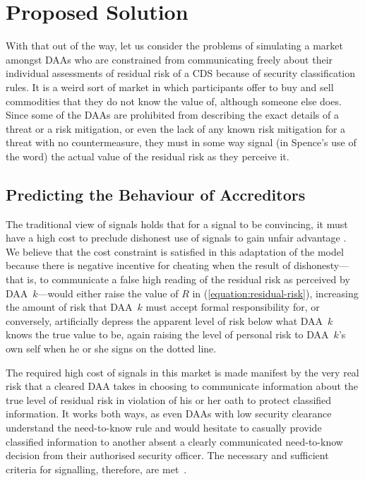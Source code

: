 \documentclass{llncs}
\begin{document}
\section{Proposed Solution}

With that out of the way, let us consider the problems of simulating a
market amongst DAAs who are constrained from communicating freely about
their individual assessments of residual risk of a CDS because of
security classification rules.  It is a weird sort of market in which
participants offer to buy and
sell commodities that they do not know the value of, although someone else
does.  Since some of the DAAs are prohibited from describing the exact details
of a threat or a risk mitigation, or even the lack of
any known risk mitigation for a threat with no countermeasure, they must
in some way signal (in Spence's use of the word) the actual value of the
residual risk as they perceive it.

\subsection{Predicting the Behaviour of Accreditors}

The traditional view of signals holds that for a signal to be convincing,
it must have a high cost to preclude dishonest use of signals to gain
unfair advantage \cite{Spence1973}.  We believe that the cost
constraint is satisfied in this adaptation of the model because there
is negative incentive for cheating when the result of dishonesty---that is,
to communicate
a false high reading of the residual risk as perceived by DAA~$k$---would
either raise the value of $R$ in (\ref{equation:residual-risk}), increasing
the amount of risk that
DAA~$k$ must accept formal responsibility for, or conversely, artificially
depress the apparent level of risk below what DAA~$k$ knows the true
value to be, again raising the level of personal risk to DAA~$k$'s own self
when he or she signs on the dotted line.

The required high cost of signals in this market is made
manifest by the very real risk that a cleared DAA takes in choosing to
communicate information about the true level of residual risk in violation
of his or her oath to protect classified information.  It works both
ways, as even DAAs with low security clearance understand the need-to-know
rule and would hesitate to casually provide classified information to another
absent a clearly communicated need-to-know decision from their authorised
security officer.  The necessary and sufficient criteria for signalling, therefore, are
met~\cite[pp.\ 499--500 and 367, respectively]{Akerlof1970,Spence1973}.
\end{document}
